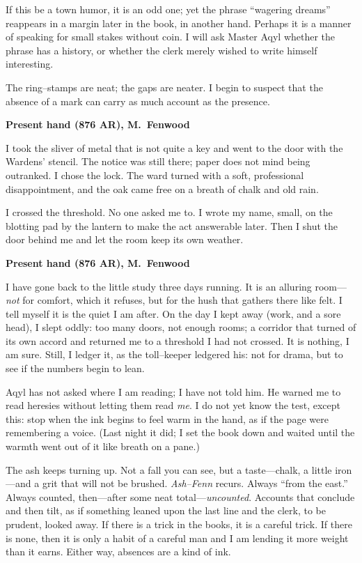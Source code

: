 \documentclass[11pt]{article}
\numberwithin{equation}{section} %
\theoremstyle{plain} %
\theoremstyle{definition} %
\theoremstyle{remark} %
\begin{document}
If this be a town humor, it is an odd one; yet the phrase “wagering dreams” reappears in a margin later in the book, in another hand. Perhaps it is a manner of speaking for small stakes without coin. I will ask Master Aqyl whether the phrase has a history, or whether the clerk merely wished to write himself interesting.

The ring–stamps are neat; the gaps are neater. I begin to suspect that the absence of a mark can carry as much account as the presence.

\medskip

\noindent\textbf{Present hand (876 AR), M.\ Fenwood}

I took the sliver of metal that is not quite a key and went to the door with the Wardens’ stencil. The notice was still there; paper does not mind being outranked. I chose the lock. The ward turned with a soft, professional disappointment, and the oak came free on a breath of chalk and old rain.

I crossed the threshold. No one asked me to. I wrote my name, small, on the blotting pad by the lantern to make the act answerable later. Then I shut the door behind me and let the room keep its own weather.

\medskip
\noindent\textbf{Present hand (876 AR), M.\ Fenwood}

I have gone back to the little study three days running. It is an alluring room—\emph{not} for comfort, which it refuses, but for the hush that gathers there like felt. I tell myself it is the quiet I am after. On the day I kept away (work, and a sore head), I slept oddly: too many doors, not enough rooms; a corridor that turned of its own accord and returned me to a threshold I had not crossed. It is nothing, I am sure. Still, I ledger it, as the toll–keeper ledgered his: not for drama, but to see if the numbers begin to lean.

Aqyl has not asked where I am reading; I have not told him. He warned me to read heresies without letting them read \emph{me}. I do not yet know the test, except this: stop when the ink begins to feel warm in the hand, as if the page were remembering a voice. (Last night it did; I set the book down and waited until the warmth went out of it like breath on a pane.)

The ash keeps turning up. Not a fall you can see, but a taste—chalk, a little iron—and a grit that will not be brushed. \textit{Ash–Fenn} recurs. Always “from the east.” Always counted, then—after some neat total—\emph{uncounted}. Accounts that conclude and then tilt, as if something leaned upon the last line and the clerk, to be prudent, looked away. If there is a trick in the books, it is a careful trick. If there is none, then it is only a habit of a careful man and I am lending it more weight than it earns. Either way, absences are a kind of ink.
\end{document}
